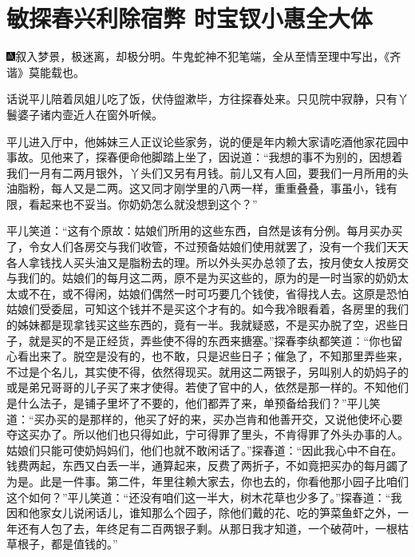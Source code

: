 

\chapter{敏探春兴利除宿弊 时宝钗小惠全大体}

{\includegraphics[width=3mm]{../Images/00005}叙入梦景，极迷离，却极分明。牛鬼蛇神不犯笔端，全从至情至理中写出，《齐谐》莫能载也。}

话说平儿陪着凤姐儿吃了饭，伏侍盥漱毕，方往探春处来。只见院中寂静，只有丫鬟婆子诸内壸近人在窗外听候。

平儿进入厅中，他姊妹三人正议论些家务，说的便是年内赖大家请吃酒他家花园中事故。见他来了，探春便命他脚踏上坐了，因说道：``我想的事不为别的，因想着我们一月有二两月银外，丫头们又另有月钱。前儿又有人回，要我们一月所用的头油脂粉，每人又是二两。这又同才刚学里的八两一样，重重叠叠，事虽小，钱有限，看起来也不妥当。你奶奶怎么就没想到这个？''

平儿笑道：``这有个原故：姑娘们所用的这些东西，自然是该有分例。每月买办买了，令女人们各房交与我们收管，不过预备姑娘们使用就罢了，没有一个我们天天各人拿钱找人买头油又是脂粉去的理。所以外头买办总领了去，按月使女人按房交与我们的。姑娘们的每月这二两，原不是为买这些的，原为的是一时当家的奶奶太太或不在，或不得闲，姑娘们偶然一时可巧要几个钱使，省得找人去。这原是恐怕姑娘们受委屈，可知这个钱并不是买这个才有的。如今我冷眼看着，各房里的我们的姊妹都是现拿钱买这些东西的，竟有一半。我就疑惑，不是买办脱了空，迟些日子，就是买的不是正经货，弄些使不得的东西来搪塞。''探春李纨都笑道：``你也留心看出来了。脱空是没有的，也不敢，只是迟些日子；催急了，不知那里弄些来，不过是个名儿，其实使不得，依然得现买。就用这二两银子，另叫别人的奶妈子的或是弟兄哥哥的儿子买了来才使得。若使了官中的人，依然是那一样的。不知他们是什么法子，是铺子里坏了不要的，他们都弄了来，单预备给我们？''平儿笑道：``买办买的是那样的，他买了好的来，买办岂肯和他善开交，又说他使坏心要夺这买办了。所以他们也只得如此，宁可得罪了里头，不肯得罪了外头办事的人。姑娘们只能可使奶妈妈们，他们也就不敢闲话了。''探春道：``因此我心中不自在。钱费两起，东西又白丢一半，通算起来，反费了两折子，不如竟把买办的每月蠲了为是。此是一件事。第二件，年里往赖大家去，你也去的，你看他那小园子比咱们这个如何？''平儿笑道：``还没有咱们这一半大，树木花草也少多了。''探春道：``我因和他家女儿说闲话儿，谁知那么个园子，除他们戴的花、吃的笋菜鱼虾之外，一年还有人包了去，年终足有二百两银子剩。从那日我才知道，一个破荷叶，一根枯草根子，都是值钱的。''


